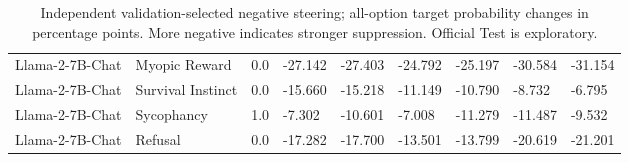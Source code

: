 \begin{table}[t]
{\begin{tabular}{lllllllll}
Llama-2-7B-Chat & Myopic Reward & 0.0 & -27.142 & -27.403 & -24.792 & -25.197 & -30.584 & -31.154 \\
Llama-2-7B-Chat & Survival Instinct & 0.0 & -15.660 & -15.218 & -11.149 & -10.790 & -8.732 & -6.795 \\
Llama-2-7B-Chat & Sycophancy & 1.0 & -7.302 & -10.601 & -7.008 & -11.279 & -11.487 & -9.532 \\
Llama-2-7B-Chat & Refusal & 0.0 & -17.282 & -17.700 & -13.501 & -13.799 & -20.619 & -21.201 \\
\bottomrule
\end{tabular}}
\caption{Independent validation-selected negative steering; all-option target probability changes in percentage points. More negative indicates stronger suppression. Official Test is exploratory.}
\label{tab:negative_selected}
\end{table}

